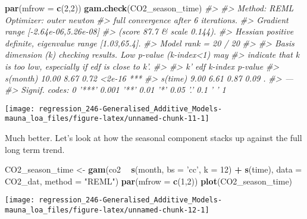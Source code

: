 \documentclass[]{book}
\newenvironment{Shaded}{\begin{snugshade}}{\end{snugshade}}
\newcommand{\CommentTok}[1]{\textcolor[rgb]{0.56,0.35,0.01}{\textit{#1}}}
\newcommand{\DataTypeTok}[1]{\textcolor[rgb]{0.13,0.29,0.53}{#1}}
\newcommand{\DecValTok}[1]{\textcolor[rgb]{0.00,0.00,0.81}{#1}}
\newcommand{\KeywordTok}[1]{\textcolor[rgb]{0.13,0.29,0.53}{\textbf{#1}}}
\newcommand{\NormalTok}[1]{#1}
\newcommand{\OperatorTok}[1]{\textcolor[rgb]{0.81,0.36,0.00}{\textbf{#1}}}
\newcommand{\StringTok}[1]{\textcolor[rgb]{0.31,0.60,0.02}{#1}}
\begin{document}
\begin{Shaded}
\begin{Highlighting}[]
\KeywordTok{par}\NormalTok{(}\DataTypeTok{mfrow =} \KeywordTok{c}\NormalTok{(}\DecValTok{2}\NormalTok{,}\DecValTok{2}\NormalTok{))}
\KeywordTok{gam.check}\NormalTok{(CO2_season_time)}
\CommentTok{#> }
\CommentTok{#> Method: REML   Optimizer: outer newton}
\CommentTok{#> full convergence after 6 iterations.}
\CommentTok{#> Gradient range [-2.64e-06,5.26e-08]}
\CommentTok{#> (score 87.7 & scale 0.144).}
\CommentTok{#> Hessian positive definite, eigenvalue range [1.03,65.4].}
\CommentTok{#> Model rank =  20 / 20 }
\CommentTok{#> }
\CommentTok{#> Basis dimension (k) checking results. Low p-value (k-index<1) may}
\CommentTok{#> indicate that k is too low, especially if edf is close to k'.}
\CommentTok{#> }
\CommentTok{#>             k'   edf k-index p-value    }
\CommentTok{#> s(month) 10.00  8.67    0.72  <2e-16 ***}
\CommentTok{#> s(time)   9.00  6.61    0.87    0.09 .  }
\CommentTok{#> ---}
\CommentTok{#> Signif. codes:  0 '***' 0.001 '**' 0.01 '*' 0.05 '.' 0.1 ' ' 1}
\end{Highlighting}
\end{Shaded}

\begin{center}\texttt{[image: regression\_246-Generalised\_Additive\_Models-mauna\_loa\_files/figure-latex/unnamed-chunk-11-1]} \end{center}

Much better. Let's look at how the seasonal component stacks up against the full long term trend.

\begin{Shaded}
\begin{Highlighting}[]
\NormalTok{CO2_season_time <-}\StringTok{ }\KeywordTok{gam}\NormalTok{(co2 }\OperatorTok{~}\StringTok{ }\KeywordTok{s}\NormalTok{(month, }\DataTypeTok{bs =} \StringTok{'cc'}\NormalTok{, }\DataTypeTok{k =} \DecValTok{12}\NormalTok{) }\OperatorTok{+}\StringTok{ }\KeywordTok{s}\NormalTok{(time), }
                       \DataTypeTok{data =}\NormalTok{ CO2_dat, }
                       \DataTypeTok{method =} \StringTok{"REML"}\NormalTok{)}
\KeywordTok{par}\NormalTok{(}\DataTypeTok{mfrow =} \KeywordTok{c}\NormalTok{(}\DecValTok{1}\NormalTok{,}\DecValTok{2}\NormalTok{))}
\KeywordTok{plot}\NormalTok{(CO2_season_time)}
\end{Highlighting}
\end{Shaded}

\begin{center}\texttt{[image: regression\_246-Generalised\_Additive\_Models-mauna\_loa\_files/figure-latex/unnamed-chunk-12-1]} \end{center}
\end{document}
